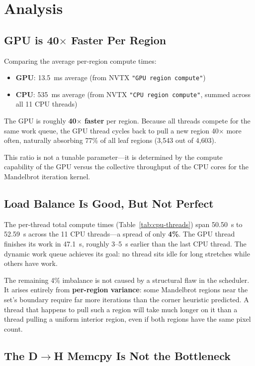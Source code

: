 \documentclass[
	english,
	letterpaper, oneside
]{article}
\begin{document}
\section{Analysis}

\subsection{GPU is 40$\times$ Faster Per Region}

Comparing the average per-region compute times:

\begin{itemize}
    \item \textbf{GPU}: 13.5~ms average (from NVTX \texttt{"GPU region compute"})
    \item \textbf{CPU}: 535~ms average (from NVTX \texttt{"CPU region compute"}, summed across all 11 CPU threads)
\end{itemize}

The GPU is roughly \textbf{40$\times$ faster} per region. Because all
threads compete for the same work queue, the GPU thread cycles back to
pull a new region 40$\times$ more often, naturally absorbing 77\% of all
leaf regions (3{,}543 out of 4{,}603).

This ratio is not a tunable parameter—it is determined by the compute
capability of the GPU versus the collective throughput of the CPU cores for
the Mandelbrot iteration kernel.

\subsection{Load Balance Is Good, But Not Perfect}

The per-thread total compute times (Table~\ref{tab:cpu-threads}) span
50.50~s to 52.59~s across the 11 CPU threads—a spread of only \textbf{4\%}.
The GPU thread finishes its work in 47.1~s, roughly 3–5~s earlier than the
last CPU thread. The dynamic work queue achieves its goal: no thread sits
idle for long stretches while others have work.

The remaining 4\% imbalance is not caused by a structural flaw in the
scheduler. It arises entirely from \textbf{per-region variance}: some
Mandelbrot regions near the set's boundary require far more iterations than
the corner heuristic predicted. A thread that happens to pull such a region
will take much longer on it than a thread pulling a uniform interior region,
even if both regions have the same pixel count.

\subsection{The D$\rightarrow$H Memcpy Is Not the Bottleneck}
\end{document}
